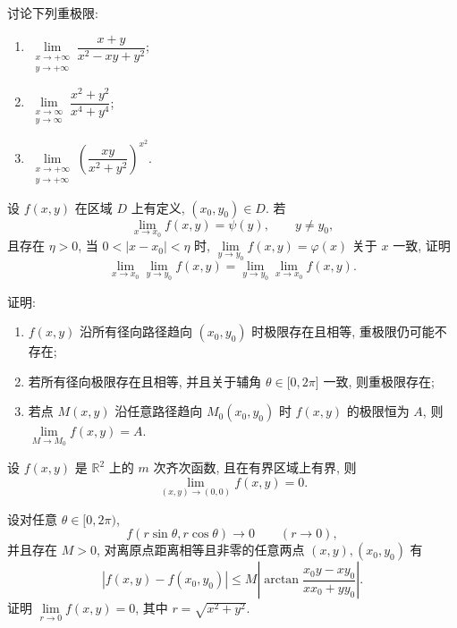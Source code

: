 \documentclass[../数学分析培优讲义.tex]{subfiles}
\begin{document}
\begin{example}
讨论下列重极限:
\begin{enumerate}[label=(\arabic*)]
    \item $\displaystyle\lim\limits_{\substack{x\to+\infty\\y\to+\infty}}\dfrac{x+y}{x^2-xy+y^2}$;
    \item $\displaystyle\lim\limits_{\substack{x\to\infty\\y\to\infty}}\dfrac{x^2+y^2}{x^4+y^4}$;
    \item $\displaystyle\lim\limits_{\substack{x\to+\infty\\y\to+\infty}}\left(\dfrac{xy}{x^2+y^2}\right)^{x^2}$.
\end{enumerate}
\end{example}
\exampleblank

\begin{example}
设 $f(x,y)$ 在区域 $D$ 上有定义, $(x_0,y_0)\in D$. 若
\[
    \lim\limits_{x\to x_0}f(x,y)=\psi(y),\qquad y\ne y_0,
\]
且存在 $\eta>0$, 当 $0<|x-x_0|<\eta$ 时, $\displaystyle\lim\limits_{y\to y_0}f(x,y)=\varphi(x)$ 关于 $x$ 一致, 证明
\[
    \lim\limits_{x\to x_0}\lim\limits_{y\to y_0}f(x,y)
    =\lim\limits_{y\to y_0}\lim\limits_{x\to x_0}f(x,y).
\]
\end{example}
\exampleblank

\begin{example}[\markstar]
证明:
\begin{enumerate}[label=(\arabic*)]
    \item $f(x,y)$ 沿所有径向路径趋向 $(x_0,y_0)$ 时极限存在且相等, 重极限仍可能不存在;
    \item 若所有径向极限存在且相等, 并且关于辅角 $\theta\in\lbrack0,2\pi\rbrack$ 一致, 则重极限存在;
    \item 若点 $M(x,y)$ 沿任意路径趋向 $M_0(x_0,y_0)$ 时 $f(x,y)$ 的极限恒为 $A$, 则 $\displaystyle\lim\limits_{M\to M_0}f(x,y)=A$.
\end{enumerate}
\end{example}
\exampleblank

\begin{example}
设 $f(x,y)$ 是 $\mathbb{R}^2$ 上的 $m$ 次齐次函数, 且在有界区域上有界, 则
\[
    \lim\limits_{(x,y)\to(0,0)}f(x,y)=0.
\]
\end{example}
\exampleblank

\begin{example}
设对任意 $\theta\in\lbrack0,2\pi)$,
\[
    f(r\sin\theta,r\cos\theta)\to0\qquad(r\to0),
\]
并且存在 $M>0$, 对离原点距离相等且非零的任意两点 $(x,y),(x_0,y_0)$ 有
\[
    |f(x,y)-f(x_0,y_0)|
    \leq M\left|\arctan\dfrac{x_0y-xy_0}{xx_0+yy_0}\right|.
\]
证明 $\displaystyle\lim\limits_{r\to0}f(x,y)=0$, 其中 $r=\sqrt{x^2+y^2}$.
\end{example}
\exampleblank
\end{document}
